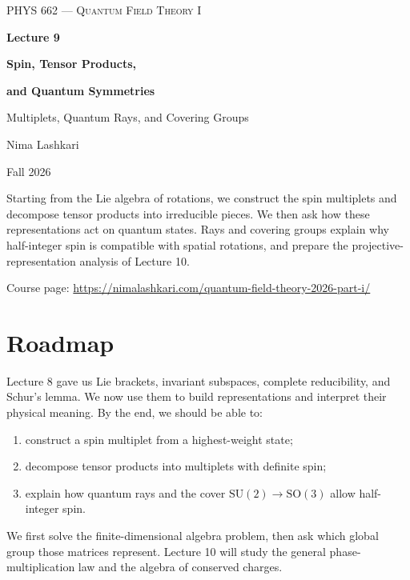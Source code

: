 \documentclass[11pt]{article}
\newcommand{\SO}{\mathrm{SO}}
\newcommand{\SU}{\mathrm{SU}}
\begin{document}
\begin{titlepage}
\centering
\vspace*{1.2in}
{\scshape\Large PHYS 662 --- Quantum Field Theory I\par}
\vspace{0.35in}
{\Huge\bfseries\color{qftblue} Lecture 9\par}
\vspace{0.15in}
{\LARGE\bfseries Spin, Tensor Products,\par}
\vspace{0.06in}
{\LARGE\bfseries and Quantum Symmetries\par}
\vspace{0.16in}
{\large\color{qftgreen} Multiplets, Quantum Rays, and Covering Groups\par}
\vspace{0.6in}
{\large Nima Lashkari\par}
{\large Fall 2026\par}
\vfill
\begin{minipage}{0.86\textwidth}
\small
Starting from the Lie algebra of rotations, we construct the spin
multiplets and decompose tensor products into irreducible pieces. We then
ask how these representations act on quantum states. Rays and covering
groups explain why half-integer spin is compatible with spatial rotations,
and prepare the projective-representation analysis of Lecture 10.

\medskip
Course page: \url{https://nimalashkari.com/quantum-field-theory-2026-part-i/}
\end{minipage}
\vspace{0.5in}
\end{titlepage}
\begingroup\small
\tableofcontents
\endgroup
\newpage
{}

\section*{Roadmap}
Lecture 8 gave us Lie brackets, invariant subspaces, complete reducibility,
and Schur's lemma. We now use them to build representations and interpret
their physical meaning. By the end, we should be able to:
\begin{enumerate}
\item construct a spin multiplet from a highest-weight state;
\item decompose tensor products into multiplets with definite spin;
\item explain how quantum rays and the cover \(\SU(2)\to\SO(3)\)
allow half-integer spin.
\end{enumerate}
We first solve the finite-dimensional algebra problem, then ask which
global group those matrices represent. Lecture 10 will study the general
phase-multiplication law and the algebra of conserved charges.
\end{document}
